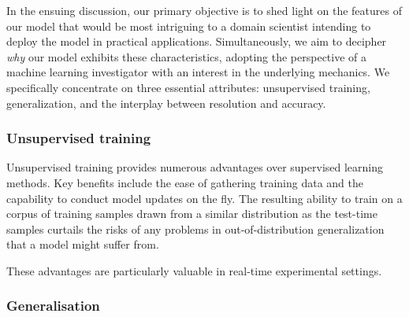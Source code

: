 \documentclass[sn-mathphys]{sn-jnl}%
\theoremstyle{thmstyleone}%
\theoremstyle{thmstyletwo}%
\theoremstyle{thmstylethree}%
\begin{document}
In the ensuing discussion, our primary objective is to shed light on the features of our model that would be most intriguing to a domain scientist intending to deploy the model in practical applications. Simultaneously, we aim to decipher \emph{why} our model exhibits these characteristics, adopting the perspective of a machine learning investigator with an interest in the underlying mechanics. We specifically concentrate on three essential attributes: unsupervised training, generalization, and the interplay between resolution and accuracy.

\subsubsection{Unsupervised training} 
Unsupervised training provides numerous advantages over supervised learning methods. Key benefits include the ease of gathering training data and the capability to conduct model updates on the fly. The resulting ability to train on a corpus of training samples drawn from a similar distribution as the test-time samples curtails the risks of any problems in out-of-distribution generalization that a model might suffer from. 

 These advantages are particularly valuable in real-time experimental settings.

\subsubsection{Generalisation} \label{sec_generalization}
\end{document}
